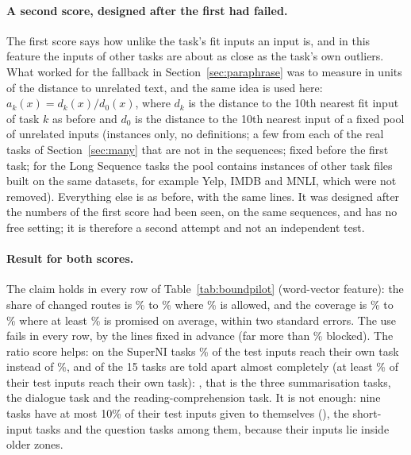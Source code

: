 \paragraph{A second score, designed after the first had failed.} The first score says how unlike the task's fit inputs an input is, and in this feature the inputs of other tasks are about as close as the task's own outliers. What worked for the fallback in Section~\ref{sec:paraphrase} was to measure in units of the distance to unrelated text, and the same idea is used here:
$a_k(x) = d_k(x) / d_0(x)$, where $d_k$ is the distance to the 10th nearest fit input of task $k$ as before and $d_0$ is the distance to the 10th nearest input of a fixed pool of \BoundPool{} unrelated inputs (instances only, no definitions; a few from each of the real tasks of Section~\ref{sec:many} that are not in the sequences; fixed before the first task; for the Long Sequence tasks the pool contains instances of other task files built on the same datasets, for example Yelp, IMDB and MNLI, which were not removed). Everything else is as before, with the same lines.
It was designed after the numbers of the first score had been seen, on the same sequences, and has no free setting; it is therefore a second attempt and not an independent test.

\paragraph{Result for both scores.} The claim holds in every row of Table~\ref{tab:boundpilot} (word-vector feature): the share of changed routes is \BoundAllChangedLow{}\% to \BoundAllChangedHigh{}\% where \BoundAlpha{}\% is allowed, and the coverage is \BoundAllCovLow{}\% to \BoundAllCovHigh{}\% where at least \BoundCovPromised{}\% is promised on average, within two standard errors. The use fails in every row, by the lines fixed in advance (far more than \BoundLineNotBlock{}\% blocked).
The ratio score helps: on the SuperNI tasks \BoundSuperniWordRatioFiveOwn{}\% of the test inputs reach their own task instead of \BoundSuperniWordKnnFiveOwn{}\%, and \BoundToldApartCount{} of the 15 tasks are told apart almost completely (at least \BoundToldApartMin{}\% of their test inputs reach their own task): \texttt{\BoundToldApartNames{}}, that is the three summarisation tasks, the dialogue task and the reading-comprehension task.
It is not enough: nine tasks have at most 10\% of their test inputs given to themselves (\BoundNotApartNames{}), the short-input tasks and the question tasks among them, because their inputs lie inside older zones. 

